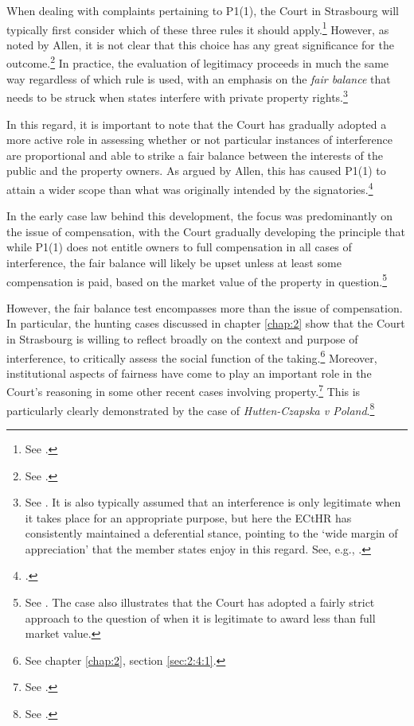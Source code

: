 When dealing with complaints pertaining to P1(1), the Court in Strasbourg will typically first consider which of these three rules it should apply.\footnote{See \cite[102-104]{allen05}.} However, as noted by Allen, it is not clear that this choice has any great significance for the outcome.\footnote{See \cite[104-105]{allen05}.} In practice, the evaluation of legitimacy proceeds in much the same way regardless of which rule is used, with an emphasis on the {\it fair balance} that needs to be struck when states interfere with private property rights.\footnote{See \cite[103]{allen05}. It is also typically assumed that an interference is only legitimate when it takes place for an appropriate purpose, but here the ECtHR has consistently maintained a deferential stance, pointing to the `wide margin of appreciation' that the member states enjoy in this regard. See, e.g., \cite[54]{james86}.}

In this regard, it is important to note that the Court has gradually adopted a more active role in assessing whether or not particular instances of interference are proportional and able to strike a fair balance between the interests of the public and the property owners. As argued by Allen, this has caused P1(1) to attain a wider scope than what was originally intended by the signatories.\footcite[1055]{allen10}

In the early case law behind this development, the focus was predominantly on the issue of compensation, with the Court gradually developing the principle that while P1(1) does not entitle owners to full compensation in all cases of interference, the fair balance will likely be upset unless at least some compensation is paid, based on the market value of the property in question.\footnote{See \cite[103]{scordino06}. The case also illustrates that the Court has adopted a fairly strict approach to the question of when it is legitimate to award less than full market value.}

However, the fair balance test encompasses more than the issue of compensation. In particular, the hunting cases discussed in chapter \ref{chap:2} show that the Court in Strasbourg is willing to reflect broadly on the context and purpose of interference, to critically assess the social function of the taking.\footnote{See chapter \ref{chap:2}, section \ref{sec:2:4:1}.} Moreover, institutional aspects of fairness have come to play an important role in the Court's reasoning in some other recent cases involving property.\footnote{See \cite{hutten06,lindheim12}.} This is particularly clearly demonstrated by the case of {\it Hutten-Czapska v Poland}.\footnote{See \cite{hutten06}.}

